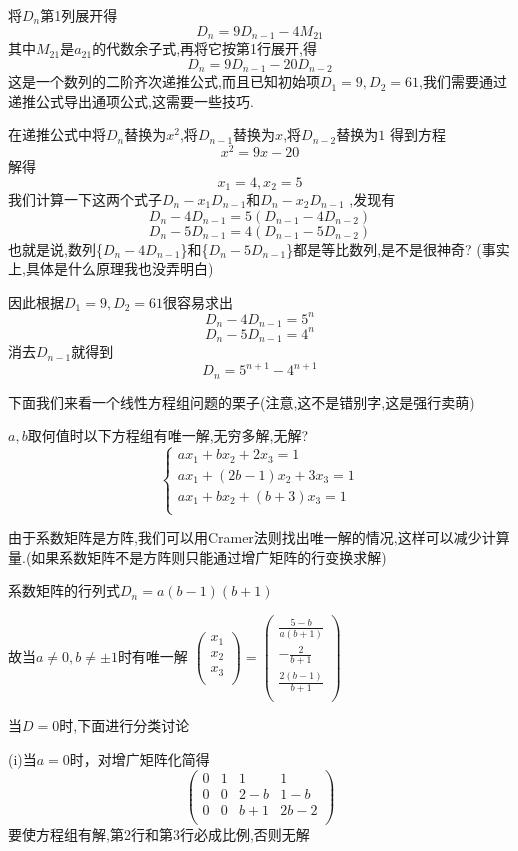 \documentclass{ctexart}\pagestyle{empty}
\begin{document}

将$D_{n}$第1列展开得$$D_{n}=9D_{n-1}-4M_{21}$$其中$M_{21}$是$a_{21}$的代数余子式,再将它按第1行展开,得$$D_{n}=9D_{n-1}-20D_{n-2}$$
这是一个数列的二阶齐次递推公式,而且已知初始项$D_{1}=9,D_{2}=61$,我们需要通过递推公式导出通项公式,这需要一些技巧.

在递推公式中将$D_{n}$替换为$x^{2}$,将$D_{n-1}$替换为$x$,将$D_{n-2}$替换为$1$
得到方程$$x^{2}=9x-20$$
解得$$x_{1}=4,x_{2}=5$$
我们计算一下这两个式子$D_{n}-x_{1}D_{n-1}$和$D_{n}-x_{2}D_{n-1}$
,发现有$$D_{n}-4D_{n-1}=5(D_{n-1}-4D_{n-2})$$
$$D_{n}-5D_{n-1}=4(D_{n-1}-5D_{n-2})$$
也就是说,数列\{$D_{n}-4D_{n-1}$\}和\{$D_{n}-5D_{n-1}$\}都是等比数列,是不是很神奇?
(事实上,具体是什么原理我也没弄明白)

因此根据$D_{1}=9,D_{2}=61$很容易求出
$$D_{n}-4D_{n-1}=5^{n}$$
$$D_{n}-5D_{n-1}=4^{n}$$
消去$D_{n-1}$就得到$$D_{n}=5^{n+1}-4^{n+1}$$

下面我们来看一个线性方程组问题的栗子(注意,这不是错别字,这是强行卖萌)


$a,b$取何值时以下方程组有唯一解,无穷多解,无解?
$$
\left\{
\begin{array}{l}
ax_{1}+bx_{2}+2x_{3}=1\\
ax_{1}+(2b-1)x_{2}+3x_{3}=1\\
ax_{1}+bx_{2}+(b+3)x_{3}=1\\
\end{array}
\right.
$$



由于系数矩阵是方阵,我们可以用Cramer法则找出唯一解的情况,这样可以减少计算量.(如果系数矩阵不是方阵则只能通过增广矩阵的行变换求解)

系数矩阵的行列式$D_{n}=a(b-1)(b+1)$

故当$a\neq0,b\neq\pm1$时有唯一解
$\left(
\begin{array}{c}
x_{1}\\
x_{2}\\
x_{3}\\
\end{array}
\right)=\left(
\begin{array}{c}
\frac{5-b}{a(b+1)}\\
-\frac{2}{b+1}\\
\frac{2(b-1)}{b+1}\\
\end{array}
\right)$

当$D=0$时,下面进行分类讨论

(i)当$a=0$时，对增广矩阵化简得
$$\left(
\begin{array}{cccc}
0&1&1&1\\
0&0&2-b&1-b\\
0&0&b+1&2b-2\\
\end{array}
\right)$$
要使方程组有解,第2行和第3行必成比例,否则无解
\end{document}
